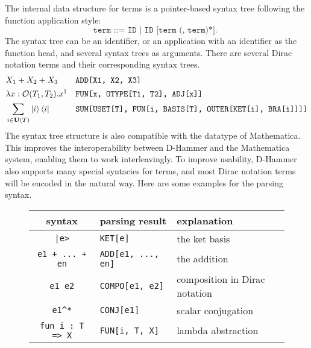 The internal data structure for terms is a pointer-based syntax tree following the function application style:
\[
    \texttt{
        term ::= ID | ID [term (, term)*].
    }
\]
The syntax tree can be an identifier, or an application with an identifier as the function head, and several syntax trees as arguments. There are several Dirac notation terms and their corresponding syntax trees.
\footnotesize{
\begin{align*}
    & X_1 + X_2 + X_3 && \texttt{ADD[X1, X2, X3]} 
    \\
    & \lambda x: \mathcal{O}(T_1,  T_2). x^\dagger && \texttt{FUN[x, OTYPE[T1, T2], ADJ[x]]}
    \\
    & \sum_{i \in \mathbf{U}(T)} \ket{i} \bra{i} && \texttt{SUM[USET[T], FUN[i, BASIS[T], OUTER[KET[i], BRA[i]]]]}
\end{align*}
}
The syntax tree structure is also compatible with the datatype of Mathematica. This improves the interoperability between D-Hammer and the Mathematica system, enabling them to work interleavingly.
To improve usability, D-Hammer also supports many special syntacies for terms,  and most Dirac notation terms will be encoded in the natural way.
Here are some examples for the parsing syntax.

\begin{figure}
    \center
\begin{tabular}{c >{\centering\arraybackslash}p{4cm} l}
    \hline
    syntax & parsing result & explanation \\
    \hline
    \texttt{|e>} & \texttt{KET[e]} & the ket basis\\
    \texttt{e1 + ... + en} & \texttt{ADD[e1, ..., en]} & the addition\\
    \texttt{e1\ e2} & \texttt{COMPO[e1, e2]} & composition in Dirac notation \\
    \texttt{e1\^{}*} & \texttt{CONJ[e1]} & scalar conjugation \\
    \texttt{fun i : T => X} & \texttt{FUN[i, T, X]} & lambda abstraction \\
    \hline
\end{tabular}
\end{figure}

